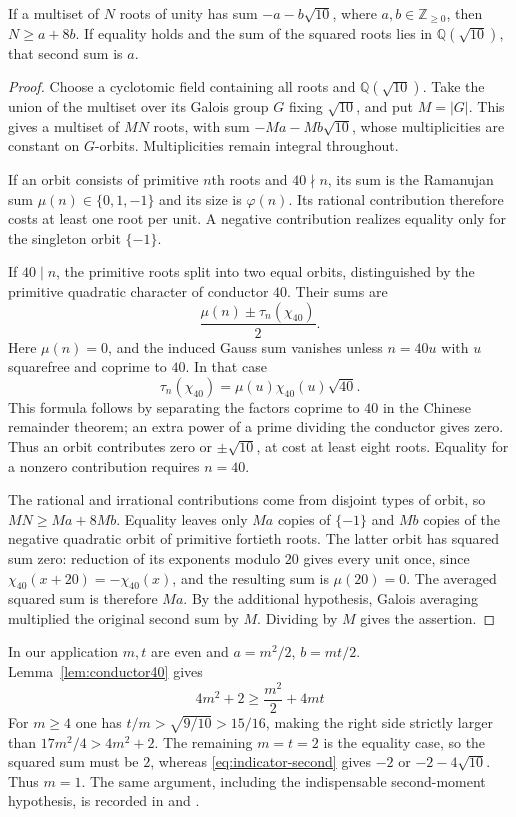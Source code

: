 \begin{lemma}\label{lem:conductor40}
If a multiset of $N$ roots of unity has sum $-a-b\sqrt{10}$, where
$a,b\in\mathbb Z_{\ge0}$, then $N\ge a+8b$. If equality holds and
the sum of the squared roots lies in $\mathbb Q(\sqrt{10})$, that
second sum is $a$.
\end{lemma}
\begin{proof}
Choose a cyclotomic field containing all roots and
$\mathbb Q(\sqrt{10})$. Take the union of the multiset over its Galois
group $G$ fixing $\sqrt{10}$, and put $M=|G|$. This gives a multiset
of $MN$ roots, with sum $-Ma-Mb\sqrt{10}$, whose multiplicities are
constant on $G$-orbits. Multiplicities remain integral throughout.

If an orbit consists of primitive $n$th roots and $40\nmid n$, its
sum is the Ramanujan sum $\mu(n)\in\{0,1,-1\}$ and its size is
$\varphi(n)$. Its rational contribution therefore costs at least one
root per unit. A negative contribution realizes equality only for
the singleton orbit $\{-1\}$.

If $40\mid n$, the primitive roots split into two equal orbits,
distinguished by the primitive quadratic character of conductor $40$.
Their sums are
\[
 \frac{\mu(n)\pm\tau_n(\chi_{40})}{2}.
\]
Here $\mu(n)=0$, and the induced Gauss sum vanishes unless
$n=40u$ with $u$ squarefree and coprime to $40$. In that case
\[
 \tau_n(\chi_{40})=\mu(u)\chi_{40}(u)\sqrt{40}.
\]
This formula follows by separating the factors coprime to $40$ in the
Chinese remainder theorem; an extra power of a prime dividing the
conductor gives zero. Thus an orbit contributes zero or
$\pm\sqrt{10}$, at cost at least eight roots. Equality for a nonzero
contribution requires $n=40$.

The rational and irrational contributions come from disjoint types
of orbit, so $MN\ge Ma+8Mb$. Equality leaves only $Ma$ copies of
$\{-1\}$ and $Mb$ copies of the negative quadratic orbit of primitive
fortieth roots. The latter orbit has squared sum zero: reduction of
its exponents modulo $20$ gives every unit once, since
$\chi_{40}(x+20)=-\chi_{40}(x)$, and the resulting sum is
$\mu(20)=0$. The averaged squared sum is therefore $Ma$.
By the additional hypothesis, Galois averaging multiplied the original
second sum by $M$. Dividing by $M$ gives the assertion.
\end{proof}

In our application $m,t$ are even and $a=m^2/2$, $b=mt/2$.
Lemma~\ref{lem:conductor40} gives
\[
 4m^2+2\ge\frac{m^2}{2}+4mt
\]
For $m\ge4$ one has $t/m>\sqrt{9/10}>15/16$, making the right side
strictly larger than $17m^2/4>4m^2+2$. The remaining $m=t=2$ is the
equality case,
so the squared sum must be $2$, whereas \eqref{eq:indicator-second}
gives $-2$ or $-2-4\sqrt{10}$. Thus $m=1$.
The same argument, including the indispensable second-moment
hypothesis, is recorded in
 and
.

